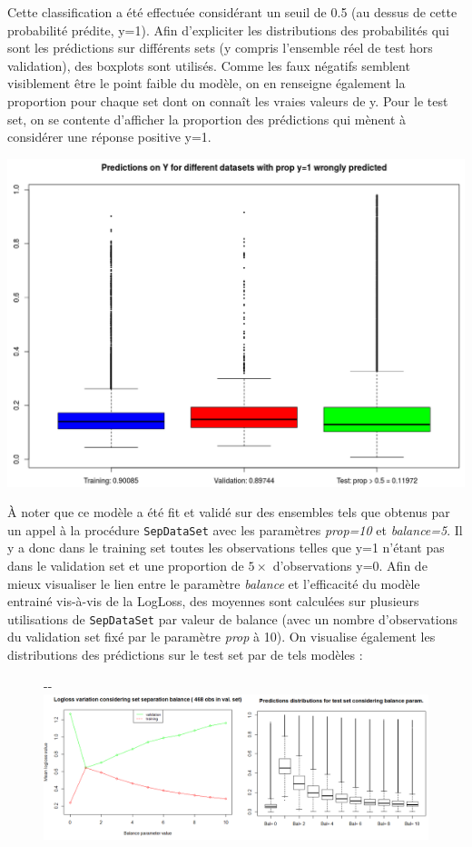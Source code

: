 \documentclass[]{article}
\begin{document}
Cette classification a été effectuée considérant un seuil de 0.5 (au dessus de cette probabilité prédite, y=1). Afin d'expliciter les distributions des probabilités qui sont les prédictions sur différents sets (y compris l'ensemble réel de test hors validation), des boxplots sont utilisés. Comme les faux négatifs semblent visiblement être le point faible du modèle, on en renseigne également la proportion pour chaque set dont on connaît les vraies valeurs de y. Pour le test set, on se contente d'afficher la proportion des prédictions qui mènent à considérer une réponse positive y=1.
\begin{center}
\includegraphics[scale=0.35]{pred_distrib}
\end{center}

À noter que ce modèle a été fit et validé sur des ensembles tels que obtenus par un appel à la procédure \texttt{SepDataSet} avec les paramètres \textit{prop=10} et \textit{balance=5}. Il y a donc dans le training set toutes les observations telles que y=1 n'étant pas dans le validation set et une proportion de $5 \times$ d'observations y=0. Afin de mieux visualiser le lien entre le paramètre \textit{balance} et l'efficacité du modèle entrainé vis-à-vis de la LogLoss, des moyennes sont calculées sur plusieurs utilisations de \texttt{SepDataSet} par valeur de balance (avec un nombre d'observations du validation set fixé par le paramètre \textit{prop} à 10). On visualise également les distributions des prédictions sur le test set par de tels modèles :

\begin{figure}[!ht]
   \begin{adjustwidth}{-\oddsidemargin-1in}{-\rightmargin}
     \centering
     \includegraphics[width=\textwidth]{balance_both}
   \end{adjustwidth}
\end{figure}
\end{document}

